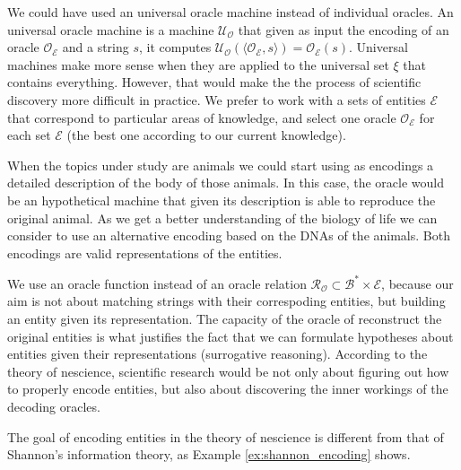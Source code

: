 We could have used an universal oracle machine instead of individual oracles. An universal oracle machine is a machine $\mathcal{U}_\mathcal{O}$ that given as input the encoding of an oracle $\mathcal{O}_\mathcal{E}$ and a string $s$, it computes $\mathcal{U}_\mathcal{O} \left( \langle \mathcal{O}_\mathcal{E}, s \rangle \right) = \mathcal{O}_\mathcal{E} \left( s \right)$. Universal machines make more sense when they are applied to the universal set $\xi$ that contains everything. However, that would make the the process of scientific discovery more difficult in practice. We prefer to work with a sets of entities $\mathcal{E}$ that correspond to particular areas of knowledge, and select one oracle $\mathcal{O}_\mathcal{E}$ for each set $\mathcal{E}$ (the best one according to our current knowledge).

\begin{example}
\label{ex:description_dna}
When the topics under study are animals we could start using as encodings a detailed description of the body of those animals. In this case, the oracle would be an hypothetical machine that given its description is able to reproduce the original animal. As we get a better understanding of the biology of life we can consider to use an alternative encoding based on the DNAs of the animals. Both encodings are valid representations of the entities.
\end{example}

We use an oracle function instead of an oracle relation $\mathcal{R}_\mathcal{O} \subset \mathcal{B}^\ast \times \mathcal{E}$, because our aim is not about matching strings with their correspoding entities, but building an entity given its representation. The capacity of the oracle of reconstruct the original entities is what justifies the fact that we can formulate hypotheses about entities given their representations (surrogative reasoning). According to the theory of nescience, scientific research would be not only about figuring out how to properly encode entities, but also about discovering the inner workings of the decoding oracles. 

The goal of encoding entities in the theory of nescience is different from that of Shannon's information theory, as Example \ref{ex:shannon_encoding} shows.

